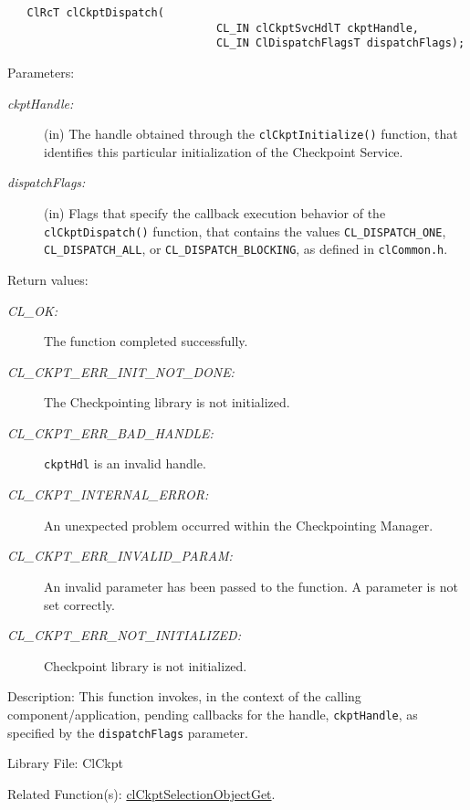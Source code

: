 \begin{flushleft}
\begin{Desc}
\footnotesize\begin{verbatim}   ClRcT clCkptDispatch(
                      			CL_IN clCkptSvcHdlT ckptHandle,
                      			CL_IN ClDispatchFlagsT dispatchFlags);
\end{verbatim}
\normalsize
\end{Desc}
\begin{Desc}
\item[Parameters:]
\begin{description}
\item[{\em ckpt\-Handle:}](in) The handle obtained through the {\tt{clCkptInitialize()}} function, that identifies this particular 
initialization of the Checkpoint Service.
\item[{\em dispatch\-Flags:}](in) Flags that specify the callback execution behavior of the
{\tt{clCkptDispatch()}} function, that contains the values {\tt{CL\_\-DISPATCH\_\-ONE}}, {\tt{CL\_\-DISPATCH\_\-ALL}}, or 
{\tt{CL\_\-DISPATCH\_\-BLOCKING}}, as defined in {\tt{clCommon.h}}.\end{description}
\end{Desc}
\begin{Desc}
\item[Return values:]
\begin{description}
\item[{\em CL\_\-OK:}]The function completed successfully. 
\item[{\em CL\_\-CKPT\_\-ERR\_\-INIT\_\-NOT\_\-DONE:}]The Checkpointing library is not initialized.
\item[{\em CL\_\-CKPT\_\-ERR\_\-BAD\_\-HANDLE:}]{\tt{ckptHdl}} is an invalid handle.
\item[{\em CL\_\-CKPT\_\-INTERNAL\_\-ERROR:}]An unexpected problem occurred within the Checkpointing Manager. 
\item[{\em CL\_\-CKPT\_\-ERR\_\-INVALID\_\-PARAM:}]An invalid parameter has been passed to the function. A parameter is not set correctly.
\item[{\em CL\_\-CKPT\_\-ERR\_\-NOT\_\-INITIALIZED:}]Checkpoint library is not initialized.

\end{description}
\end{Desc}
\begin{Desc}
\item[Description:]This function invokes, in the context of the calling component/application, pending callbacks for the handle, {\tt{ckpt\-Handle}}, 
as specified by the {\tt{dispatch\-Flags}} parameter.\end{Desc}
\begin{Desc}
\item[Library File:]Cl\-Ckpt\end{Desc}
\begin{Desc}
\item[Related Function(s):]\hyperlink{pageckpt122}{cl\-Ckpt\-Selection\-Object\-Get}. \end{Desc}
\newpage



\end{flushleft}
